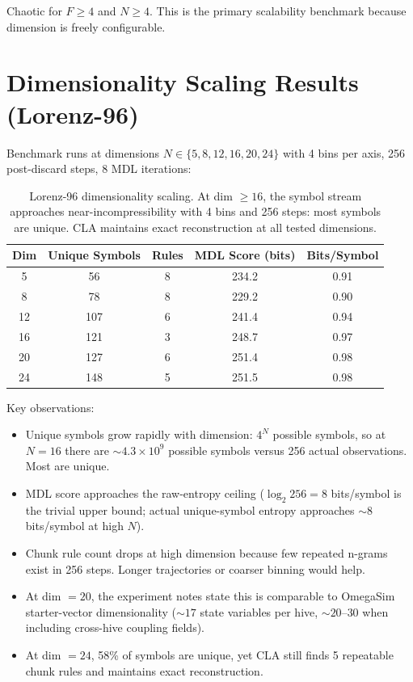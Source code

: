 \documentclass[11pt]{article}
\begin{document}
Chaotic for $F \geq 4$ and $N \geq 4$. This is the primary scalability
benchmark because dimension is freely configurable.

\section{Dimensionality Scaling Results (Lorenz-96)}

Benchmark runs at dimensions $N \in \{5, 8, 12, 16, 20, 24\}$ with
4 bins per axis, 256 post-discard steps, 8 MDL iterations:

\begin{table}[h]
\centering
\begin{tabular}{ccccc}
\toprule
Dim & Unique Symbols & Rules & MDL Score (bits) & Bits/Symbol \\
\midrule
5  & 56  & 8 & 234.2 & 0.91 \\
8  & 78  & 8 & 229.2 & 0.90 \\
12 & 107 & 6 & 241.4 & 0.94 \\
16 & 121 & 3 & 248.7 & 0.97 \\
20 & 127 & 6 & 251.4 & 0.98 \\
24 & 148 & 5 & 251.5 & 0.98 \\
\bottomrule
\end{tabular}
\caption{Lorenz-96 dimensionality scaling. At dim $\geq 16$, the symbol
stream approaches near-incompressibility with 4 bins and 256 steps:
most symbols are unique. CLA maintains exact reconstruction at all
tested dimensions.}
\end{table}

Key observations:
\begin{itemize}
\item Unique symbols grow rapidly with dimension: $4^N$ possible symbols,
so at $N=16$ there are $\sim 4.3 \times 10^9$ possible symbols versus
256 actual observations. Most are unique.
\item MDL score approaches the raw-entropy ceiling ($\log_2 256 = 8$ bits/symbol
is the trivial upper bound; actual unique-symbol entropy approaches
$\sim 8$ bits/symbol at high $N$).
\item Chunk rule count drops at high dimension because few repeated n-grams
exist in 256 steps. Longer trajectories or coarser binning would help.
\item At dim $= 20$, the experiment notes state this is comparable to
OmegaSim starter-vector dimensionality ($\sim 17$ state variables per hive,
$\sim 20$--$30$ when including cross-hive coupling fields).
\item At dim $= 24$, 58\% of symbols are unique, yet CLA still finds
5 repeatable chunk rules and maintains exact reconstruction.
\end{itemize}
\end{document}
